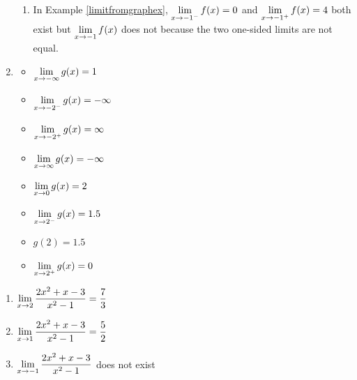 \begin{enumerate}
\begin{enumerate}
\item  In Example \ref{limitfromgraphex},  $\displaystyle{\lim_{x \rightarrow -1^{-}} f(x)  = 0}$ and $\displaystyle{\lim_{x \rightarrow -1^{+}} f(x) = 4}$ both exist but $\displaystyle{\lim_{x \rightarrow -1} f(x)}$ does not because the two one-sided limits are not equal.

\end{enumerate}

\item  \begin{multicols}{4} \begin{itemize} \item $\displaystyle{\lim_{x \rightarrow -\infty} g(x) = 1}$

\item $\displaystyle{\lim_{x \rightarrow -2^{-}} g(x) = -\infty}$

\item $\displaystyle{\lim_{x \rightarrow -2^{+}} g(x) = \infty}$

\item  $\displaystyle{\lim_{x \rightarrow \infty} g(x) = -\infty}$

\end{itemize}

\end{multicols}

\bigskip

\begin{multicols}{4}

\begin{itemize}

\item $\displaystyle{\lim_{x \rightarrow 0} g(x) = 2}$

\item $\displaystyle{\lim_{x \rightarrow 2^{-}} g(x) = 1.5}$

\item  $g(2) = 1.5$

\item $\displaystyle{\lim_{x \rightarrow 2^{+}} g(x) = 0}$
\end{itemize}

\end{multicols}

\bigskip

\setcounter{HW}{\value{enumi}}
\end{enumerate}
 


\begin{enumerate}
\setcounter{enumi}{\value{HW}}

\item  $\displaystyle{\lim_{x \rightarrow 2} \dfrac{2x^2+x-3}{x^2-1} = \frac{7}{3}}$

\medskip
  
\item  $\displaystyle{\lim_{x \rightarrow 1} \dfrac{2x^2+x-3}{x^2-1} = \frac{5}{2}}$

\medskip

\item   $\displaystyle{\lim_{x \rightarrow -1} \dfrac{2x^2+x-3}{x^2-1}}$ does not exist

\medskip

\setcounter{HW}{\value{enumi}}
\end{enumerate}



